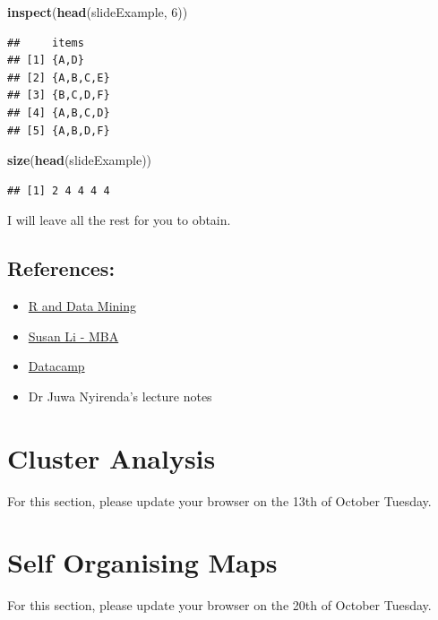 \documentclass[
]{book}
\newenvironment{Shaded}{\begin{snugshade}}{\end{snugshade}}
\newcommand{\DecValTok}[1]{\textcolor[rgb]{0.00,0.00,0.81}{#1}}
\newcommand{\KeywordTok}[1]{\textcolor[rgb]{0.13,0.29,0.53}{\textbf{#1}}}
\newcommand{\NormalTok}[1]{#1}
\providecommand{\tightlist}{%
  \setlength{\itemsep}{0pt}\setlength{\parskip}{0pt}}
\begin{document}
\begin{Shaded}
\begin{Highlighting}[]
\KeywordTok{inspect}\NormalTok{(}\KeywordTok{head}\NormalTok{(slideExample, }\DecValTok{6}\NormalTok{))}
\end{Highlighting}
\end{Shaded}

\begin{verbatim}
##     items    
## [1] {A,D}    
## [2] {A,B,C,E}
## [3] {B,C,D,F}
## [4] {A,B,C,D}
## [5] {A,B,D,F}
\end{verbatim}

\begin{Shaded}
\begin{Highlighting}[]
\KeywordTok{size}\NormalTok{(}\KeywordTok{head}\NormalTok{(slideExample))}
\end{Highlighting}
\end{Shaded}

\begin{verbatim}
## [1] 2 4 4 4 4
\end{verbatim}

I will leave all the rest for you to obtain.

\hypertarget{references}{%
\section{References:}\label{references}}

\begin{itemize}
\tightlist
\item
  \href{http://www.rdatamining.com/examples/association-rules}{R and Data Mining}
\item
  \href{https://github.com/susanli2016/Data-Analysis-with-R/blob/master/Market_Basket_Analysis.Rmd}{Susan Li - MBA}
\item
  \href{https://www.datacamp.com/community/tutorials/market-basket-analysis-r}{Datacamp}
\item
  Dr Juwa Nyirenda's lecture notes
\end{itemize}

\hypertarget{cluster-analysis}{%
\chapter{Cluster Analysis}\label{cluster-analysis}}

For this section, please update your browser on the 13th of October Tuesday.

\hypertarget{self-organising-maps}{%
\chapter{Self Organising Maps}\label{self-organising-maps}}

For this section, please update your browser on the 20th of October Tuesday.

  
\end{document}
